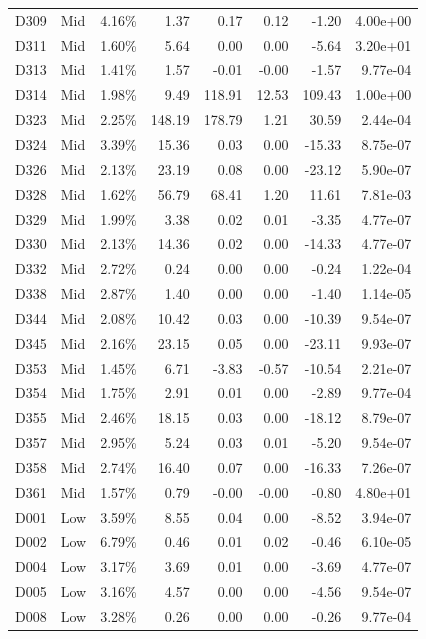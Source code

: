 \begin{tabular}{l l r r r r r r}
D309 & Mid & 4.16\% & 1.37 & 0.17 & 0.12 & -1.20 & 4.00e+00 \\
D311 & Mid & 1.60\% & 5.64 & 0.00 & 0.00 & -5.64 & 3.20e+01 \\
D313 & Mid & 1.41\% & 1.57 & -0.01 & -0.00 & -1.57 & 9.77e-04 \\
D314 & Mid & 1.98\% & 9.49 & 118.91 & 12.53 & 109.43 & 1.00e+00 \\
D323 & Mid & 2.25\% & 148.19 & 178.79 & 1.21 & 30.59 & 2.44e-04 \\
D324 & Mid & 3.39\% & 15.36 & 0.03 & 0.00 & -15.33 & 8.75e-07 \\
D326 & Mid & 2.13\% & 23.19 & 0.08 & 0.00 & -23.12 & 5.90e-07 \\
D328 & Mid & 1.62\% & 56.79 & 68.41 & 1.20 & 11.61 & 7.81e-03 \\
D329 & Mid & 1.99\% & 3.38 & 0.02 & 0.01 & -3.35 & 4.77e-07 \\
D330 & Mid & 2.13\% & 14.36 & 0.02 & 0.00 & -14.33 & 4.77e-07 \\
D332 & Mid & 2.72\% & 0.24 & 0.00 & 0.00 & -0.24 & 1.22e-04 \\
D338 & Mid & 2.87\% & 1.40 & 0.00 & 0.00 & -1.40 & 1.14e-05 \\
D344 & Mid & 2.08\% & 10.42 & 0.03 & 0.00 & -10.39 & 9.54e-07 \\
D345 & Mid & 2.16\% & 23.15 & 0.05 & 0.00 & -23.11 & 9.93e-07 \\
D353 & Mid & 1.45\% & 6.71 & -3.83 & -0.57 & -10.54 & 2.21e-07 \\
D354 & Mid & 1.75\% & 2.91 & 0.01 & 0.00 & -2.89 & 9.77e-04 \\
D355 & Mid & 2.46\% & 18.15 & 0.03 & 0.00 & -18.12 & 8.79e-07 \\
D357 & Mid & 2.95\% & 5.24 & 0.03 & 0.01 & -5.20 & 9.54e-07 \\
D358 & Mid & 2.74\% & 16.40 & 0.07 & 0.00 & -16.33 & 7.26e-07 \\
D361 & Mid & 1.57\% & 0.79 & -0.00 & -0.00 & -0.80 & 4.80e+01 \\
D001 & Low & 3.59\% & 8.55 & 0.04 & 0.00 & -8.52 & 3.94e-07 \\
D002 & Low & 6.79\% & 0.46 & 0.01 & 0.02 & -0.46 & 6.10e-05 \\
D004 & Low & 3.17\% & 3.69 & 0.01 & 0.00 & -3.69 & 4.77e-07 \\
D005 & Low & 3.16\% & 4.57 & 0.00 & 0.00 & -4.56 & 9.54e-07 \\
D008 & Low & 3.28\% & 0.26 & 0.00 & 0.00 & -0.26 & 9.77e-04 \\

\end{tabular}
